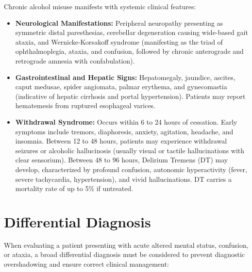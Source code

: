 Chronic alcohol misuse manifests with systemic clinical features:
\begin{itemize}
    \item \textbf{Neurological Manifestations:} Peripheral neuropathy presenting as symmetric distal paresthesias, cerebellar degeneration causing wide-based gait ataxia, and Wernicke-Korsakoff syndrome (manifesting as the triad of ophthalmoplegia, ataxia, and confusion, followed by chronic anterograde and retrograde amnesia with confabulation).
    \item \textbf{Gastrointestinal and Hepatic Signs:} Hepatomegaly, jaundice, ascites, caput medusae, spider angiomata, palmar erythema, and gynecomastia (indicative of hepatic cirrhosis and portal hypertension). Patients may report hematemesis from ruptured esophageal varices.
    \item \textbf{Withdrawal Syndrome:} Occurs within 6 to 24 hours of cessation. Early symptoms include tremors, diaphoresis, anxiety, agitation, headache, and insomnia. Between 12 to 48 hours, patients may experience withdrawal seizures or alcoholic hallucinosis (usually visual or tactile hallucinations with clear sensorium). Between 48 to 96 hours, Delirium Tremens (DT) may develop, characterized by profound confusion, autonomic hyperactivity (fever, severe tachycardia, hypertension), and vivid hallucinations. DT carries a mortality rate of up to 5\% if untreated.
\end{itemize}

\section*{Differential Diagnosis}
When evaluating a patient presenting with acute altered mental status, confusion, or ataxia, a broad differential diagnosis must be considered to prevent diagnostic overshadowing and ensure correct clinical management:

